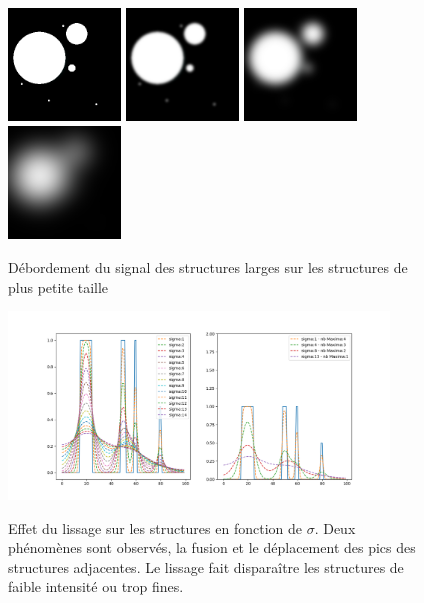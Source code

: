   \begin{figure}[h]
    \centering
    \includegraphics[height=3cm]{Images/gaussian_spilling_init.png}
    \includegraphics[height=3cm]{Images/gaussian_spilling_g10.png}
    \includegraphics[height=3cm]{Images/gaussian_spilling_g40.png}
    \includegraphics[height=3cm]{Images/gaussian_spilling_g100.png}
    \label{fig:scale_space_spilling}
    \caption{Débordement du signal des structures larges sur les structures de plus petite taille}
  \end{figure}
  
  \begin{figure}[h]
    \centering
    \includegraphics[height=5cm]{Images/GSP_experiment.png}
    \label{fig:scale_space_spilling2}
    \caption{Effet du lissage sur les structures en fonction de $\sigma$. Deux phénomènes sont observés, la fusion et le déplacement des pics des structures adjacentes. Le lissage fait disparaître les structures de faible intensité ou trop fines.}
  \end{figure}
  

